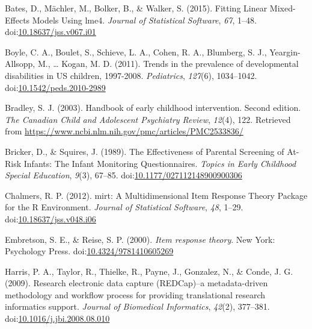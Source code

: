 \documentclass[
  11pt,
]{article}
\newlength{\cslhangindent}
\newlength{\cslentryspacingunit} %
\newenvironment{CSLReferences}[2] %
 {%
  \setlength{\parindent}{0pt}
  \ifodd #1
  \let\oldpar\par
  \def\par{\hangindent=\cslhangindent\oldpar}
  \fi
  \setlength{\parskip}{#2\cslentryspacingunit}
 }%
 {}
\begin{document}
\hypertarget{refs}{}
\begin{CSLReferences}{1}{0}
\leavevmode{}%
Bates, D., Mächler, M., Bolker, B., \& Walker, S. (2015). Fitting Linear
Mixed-Effects Models Using lme4. \emph{Journal of Statistical Software},
\emph{67}, 1--48.
doi:\href{https://doi.org/10.18637/jss.v067.i01}{10.18637/jss.v067.i01}

\leavevmode{}%
Boyle, C. A., Boulet, S., Schieve, L. A., Cohen, R. A., Blumberg, S. J.,
Yeargin-Allsopp, M., \ldots{} Kogan, M. D. (2011). Trends in the
prevalence of developmental disabilities in US children, 1997-2008.
\emph{Pediatrics}, \emph{127}(6), 1034--1042.
doi:\href{https://doi.org/10.1542/peds.2010-2989}{10.1542/peds.2010-2989}

\leavevmode{}%
Bradley, S. J. (2003). Handbook of early childhood intervention. Second
edition. \emph{The Canadian Child and Adolescent Psychiatry Review},
\emph{12}(4), 122. Retrieved from
\url{https://www.ncbi.nlm.nih.gov/pmc/articles/PMC2533836/}

\leavevmode{}%
Bricker, D., \& Squires, J. (1989). The Effectiveness of Parental
Screening of At-Risk Infants: The Infant Monitoring Questionnaires.
\emph{Topics in Early Childhood Special Education}, \emph{9}(3), 67--85.
doi:\href{https://doi.org/10.1177/027112148900900306}{10.1177/027112148900900306}

\leavevmode{}%
Chalmers, R. P. (2012). mirt: A Multidimensional Item Response Theory
Package for the R Environment. \emph{Journal of Statistical Software},
\emph{48}, 1--29.
doi:\href{https://doi.org/10.18637/jss.v048.i06}{10.18637/jss.v048.i06}

\leavevmode{}%
Embretson, S. E., \& Reise, S. P. (2000). \emph{Item response theory}.
New York: Psychology Press.
doi:\href{https://doi.org/10.4324/9781410605269}{10.4324/9781410605269}

\leavevmode{}%
Harris, P. A., Taylor, R., Thielke, R., Payne, J., Gonzalez, N., \&
Conde, J. G. (2009). Research electronic data capture (REDCap)--a
metadata-driven methodology and workflow process for providing
translational research informatics support. \emph{Journal of Biomedical
Informatics}, \emph{42}(2), 377--381.
doi:\href{https://doi.org/10.1016/j.jbi.2008.08.010}{10.1016/j.jbi.2008.08.010}


\end{CSLReferences}
\end{document}
